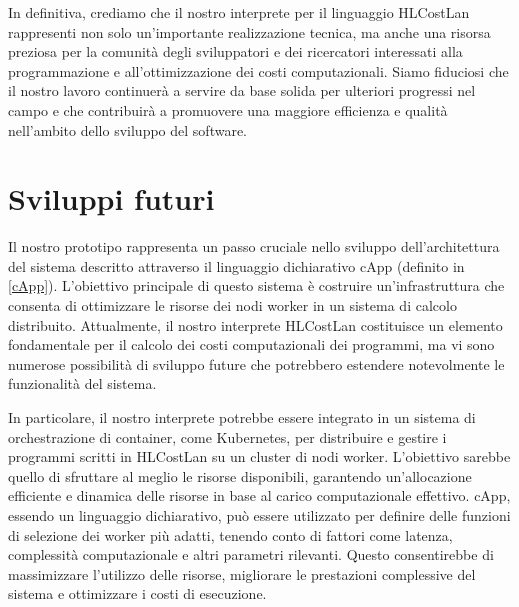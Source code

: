 \documentclass[../../main.tex]{subfiles}
\begin{document}
In definitiva, crediamo che il nostro interprete per il linguaggio HLCostLan rappresenti non solo un'importante realizzazione tecnica, ma anche una risorsa preziosa per la comunità degli sviluppatori e dei ricercatori interessati alla programmazione e all'ottimizzazione dei costi computazionali. Siamo fiduciosi che il nostro lavoro continuerà a servire da base solida per ulteriori progressi nel campo e che contribuirà a promuovere una maggiore efficienza e qualità nell'ambito dello sviluppo del software.

\section{Sviluppi futuri}
Il nostro prototipo rappresenta un passo cruciale nello sviluppo dell'architettura del sistema descritto attraverso il linguaggio dichiarativo cApp (definito in \ref{cApp}). L'obiettivo principale di questo sistema è costruire un'infrastruttura che consenta di ottimizzare le risorse dei nodi worker in un sistema di calcolo distribuito. Attualmente, il nostro interprete HLCostLan costituisce un elemento fondamentale per il calcolo dei costi computazionali dei programmi, ma vi sono numerose possibilità di sviluppo future che potrebbero estendere notevolmente le funzionalità del sistema.

In particolare, il nostro interprete potrebbe essere integrato in un sistema di orchestrazione di container, come Kubernetes, per distribuire e gestire i programmi scritti in HLCostLan su un cluster di nodi worker. L'obiettivo sarebbe quello di sfruttare al meglio le risorse disponibili, garantendo un'allocazione efficiente e dinamica delle risorse in base al carico computazionale effettivo. cApp, essendo un linguaggio dichiarativo, può essere utilizzato per definire delle funzioni di selezione dei worker più adatti, tenendo conto di fattori come latenza, complessità computazionale e altri parametri rilevanti. Questo consentirebbe di massimizzare l'utilizzo delle risorse, migliorare le prestazioni complessive del sistema e ottimizzare i costi di esecuzione.
\end{document}
